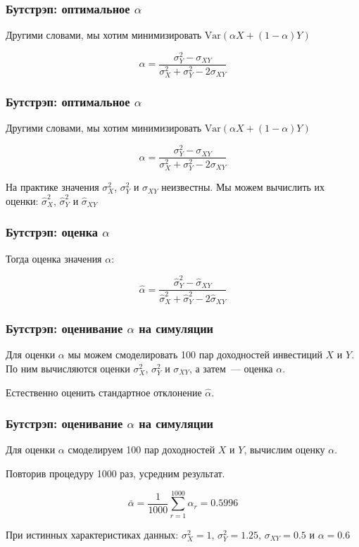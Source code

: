 \documentclass{beamer}
\begin{document}
\begin{frame}
  \frametitle{Бутстрэп: оптимальное $\alpha$}

  Другими словами, мы хотим минимизировать $\text{Var}(\alpha X + (1 - \alpha) Y)$

  $$\alpha = \frac{\sigma^2_Y - \sigma_{XY}}{\sigma^2_X + \sigma^2_Y - 2\sigma_{XY}}$$

\end{frame}

\begin{frame}
  \frametitle{Бутстрэп: оптимальное $\alpha$}

  Другими словами, мы хотим минимизировать $\text{Var}(\alpha X + (1 - \alpha) Y)$

  $$\alpha = \frac{\sigma^2_Y - \sigma_{XY}}{\sigma^2_X + \sigma^2_Y - 2\sigma_{XY}}$$

  На практике значения $\sigma^2_X$, $\sigma^2_Y$ и $\sigma_{XY}$ неизвестны. Мы можем вычислить их оценки: $\hat{\sigma}^2_X$, $\hat{\sigma}^2_Y$ и $\hat{\sigma}_{XY}$

\end{frame}

\begin{frame}
  \frametitle{Бутстрэп: оценка $\alpha$}

  Тогда оценка значения $\alpha$:

  $$\hat{\alpha} = \frac{\hat{\sigma}^2_Y - \hat{\sigma}_{XY}}{\hat{\sigma}^2_X + \hat{\sigma}^2_Y - 2\hat{\sigma}_{XY}}$$

\end{frame}

\begin{frame}
  \frametitle{Бутстрэп: оценивание $\alpha$ на симуляции}

  Для оценки $\alpha$ мы можем смоделировать 100 пар доходностей инвестиций $X$ и $Y$. По ним вычисляются оценки $\sigma^2_X$, $\sigma^2_Y$ и $\sigma_{XY}$, а затем~--- оценка $\alpha$.

  \vspace{0.2cm}

  Естественно оценить стандартное отклонение $\hat{\alpha}$.

\end{frame}

\begin{frame}
  \frametitle{Бутстрэп: оценивание $\alpha$ на симуляции}

  Для оценки $\alpha$ смоделируем 100 пар доходностей $X$ и $Y$, вычислим оценку $\alpha$.

  Повторив процедуру 1000 раз, усредним результат.

  $$\bar{\alpha} = \frac{1}{1000} \sum_{r=1}^{1000} \hat{\alpha}_r = 0.5996$$

  При истинных характеристиках данных: $\sigma^2_X = 1$, $\sigma^2_Y = 1.25$, $\sigma_{XY} = 0.5$ и $\alpha = 0.6$

\end{frame}
\end{document}
